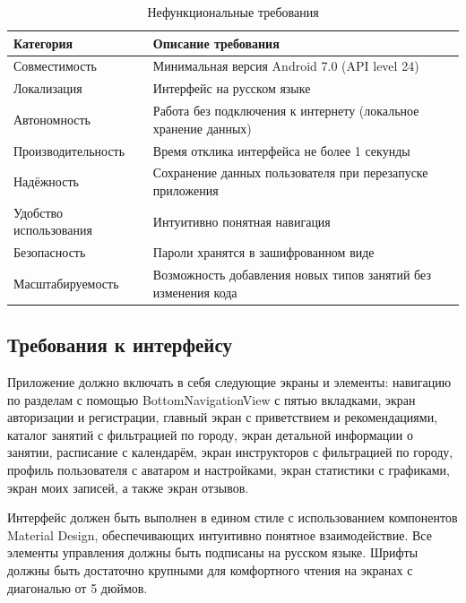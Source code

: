 \renewcommand{\arraystretch}{1.3}
\begin{table}[H]
	\centering
	\caption{Нефункциональные требования}
	\label{tab:nonfunc_req}
	\normalsize
	\setlength{\tabcolsep}{6pt}
	\begin{tabular}{|m{4.5cm}|m{10cm}|}
		\hline
		\textbf{Категория} & \textbf{Описание требования} \\
		\hline
		Совместимость & Минимальная версия Android 7.0 (API level 24) \\
		\hline
		Локализация & Интерфейс на русском языке \\
		\hline
		Автономность & Работа без подключения к интернету (локальное хранение данных) \\
		\hline
		Производительность & Время отклика интерфейса не более 1 секунды \\
		\hline
		Надёжность & Сохранение данных пользователя при перезапуске приложения \\
		\hline
		Удобство использования & Интуитивно понятная навигация \\
		\hline
		Безопасность & Пароли хранятся в зашифрованном виде \\
		\hline
		Масштабируемость & Возможность добавления новых типов занятий без изменения кода \\
		\hline
	\end{tabular}
\end{table}
\renewcommand{\arraystretch}{1}

\subsection{Требования к интерфейсу}

Приложение должно включать в себя следующие экраны и элементы: навигацию по разделам с помощью BottomNavigationView с пятью вкладками, экран авторизации и регистрации, главный экран с приветствием и рекомендациями, каталог занятий с фильтрацией по городу, экран детальной информации о занятии, расписание с календарём, экран инструкторов с фильтрацией по городу, профиль пользователя с аватаром и настройками, экран статистики с графиками, экран моих записей, а также экран отзывов.

Интерфейс должен быть выполнен в едином стиле с использованием компонентов Material Design, обеспечивающих интуитивно понятное взаимодействие. Все элементы управления должны быть подписаны на русском языке. Шрифты должны быть достаточно крупными для комфортного чтения на экранах с диагональю от 5 дюймов.

